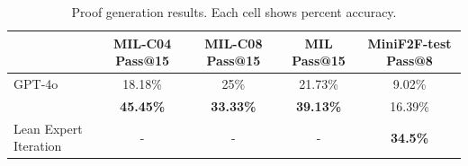 \begin{table}[t]
\caption{Proof generation results. Each cell shows percent accuracy. }
\label{tab:comp}
\centering
\small

\begin{tabular}{l|ccc|c}
\toprule
& MIL-C04 Pass@15& MIL-C08 Pass@15 & MIL Pass@15 & MiniF2F-test Pass@8\\
\midrule
GPT-4o & 18.18\% & 25\% & 21.73\% & 9.02\%\\
\methodname{} & \textbf{45.45\%} &\textbf{33.33\%} & \textbf{39.13\%} & 16.39\%\\ 
Lean Expert Iteration & - & - & - & \textbf{34.5\%}	\\
\bottomrule
\end{tabular}
\vspace{-1em} %
\end{table}